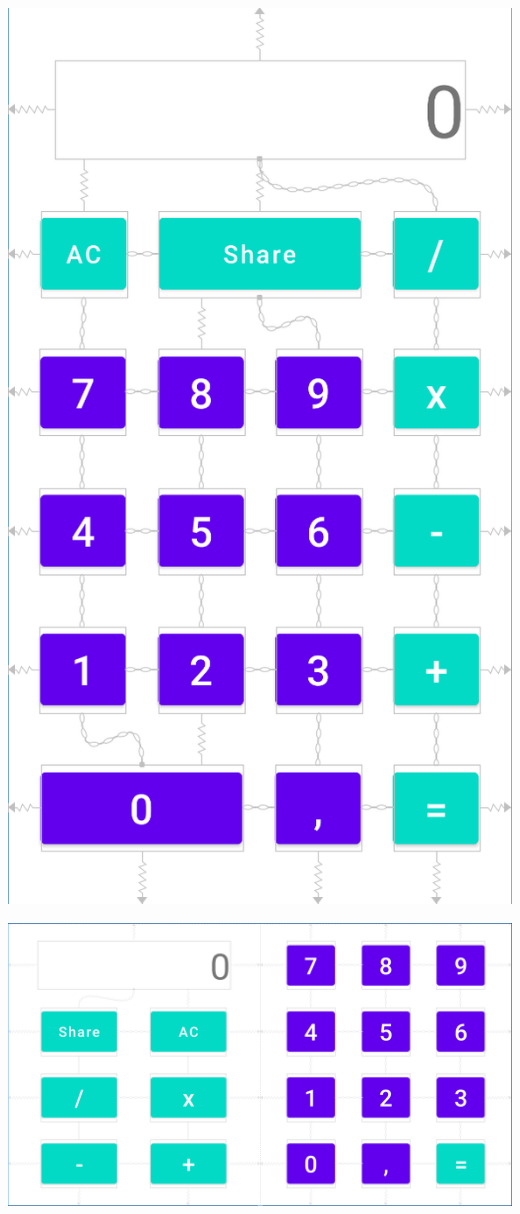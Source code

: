 \documentclass{\ClassPath/viu-tfm-template}
\begin{document}
{
    \begin{minipage}{0.3\linewidth}
        \includegraphics[frame,width=\linewidth]{img/portrait.png}
    \end{minipage}
    \hfill
    \begin{minipage}{0.65\linewidth}
        \includegraphics[frame,width=\linewidth]{img/landscape.png}
    \end{minipage}
}
\end{document}

